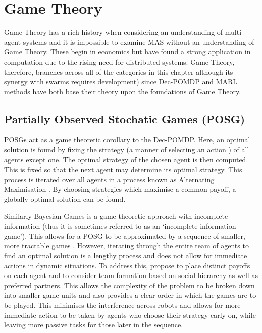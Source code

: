 \documentclass[.../main.tex]{subfiles}
\begin{document}
\section{Game Theory} \label{sec::Game_Theory}

Game Theory has a rich history when considering an understanding of multi-agent systems and it
is impossible to examine MAS without an understanding of Game Theory. These
begin in economics but have found a strong application in computation due to the rising need for
distributed systems. Game Theory, therefore, branches across all of the categories in this
chapter although its synergy with swarms requires development) since Dec-POMDP
and MARL methods have both base their theory upon the foundations of Game Theory.

\subsection{Partially Observed Stochatic Games (POSG)} \label{sec::Stochastic_Games}

POSGs act as a game theoretic corollary to the Dec-POMDP. Here, an optimal solution is found by
fixing the strategy (a manner of selecting an action \cite{Rizk2018DecisionSurvey}) of all agents
except one. The optimal strategy of the chosen agent is then computed. This is fixed so that the
next agent may determine its optimal strategy. This process is iterated over all agents in a process
known as Alternating Maximisation \cite{Ray2010AnCooperation}. By choosing strategies which maximise
a common payoff, a globally optimal solution can be found.

Similarly Bayesian Games is a game theoretic approach with incomplete information (thus it is
sometimes referred to as an ‘incomplete information game’). This allows for a POSG to be
approximated by a sequence of smaller, more tractable games
\cite{Emery-MontemerloApproximatePayoffs}. However, iterating through the entire team of agents to
find an optimal solution is a lengthy process and does not allow for immediate actions in dynamic
situations. To address this, \cite{Ray2010AnCooperation} propose to place distinct payoffs on each
agent and to consider team formation based on social hierarchy as well as preferred partners. This
allows the complexity of the problem to be broken down into smaller game units and also provides a
clear order in which the games are to be played. This minimises the interference across robots and
allows for more immediate action to be taken by agents who choose their strategy early on, while
leaving more passive tasks for those later in the sequence. 
\end{document}
